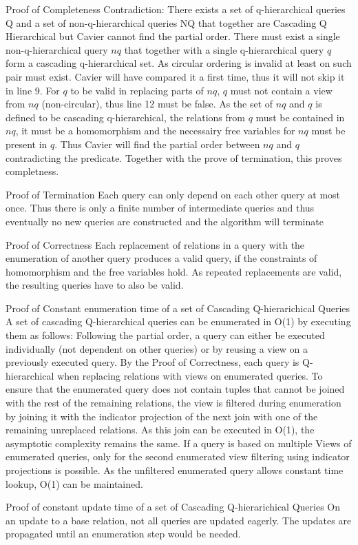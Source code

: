 \documentclass[]{article}
\begin{document}
\begin{section}{Proof of Completeness}
	Contradiction: There exists a set of q-hierarchical queries Q and a set of non-q-hierarchical queries NQ that together are Cascading Q Hierarchical but Cavier cannot find the partial order. There must exist a single non-q-hierarchical query $nq$ that together with a single q-hierarchical query $q$ form a cascading q-hierarchical set. As circular ordering is invalid at least on such pair must exist.
	Cavier will have compared it a first time, thus it will not skip it in line 9.
	For $q$ to be valid in replacing parts of $nq$, $q$ must not contain a view from $nq$ (non-circular), thus line 12 must be false.
	As the set of $nq$ and $q$ is defined to be cascading q-hierarchical, the relations from $q$ must be contained in $nq$, it must be a homomorphism and the necessairy free variables for $nq$ must be present in $q$. Thus Cavier will find the partial order between $nq$ and $q$ contradicting the predicate.
	Together with the prove of termination, this proves completness.
	
\end{section}
\begin{section}{Proof of Termination}
	Each query can only depend on each other query at most once. Thus there is only a finite number of intermediate queries and thus eventually no new queries are constructed and the algorithm will terminate	
\end{section}
\begin{section}{Proof of Correctness}
	Each replacement of relations in a query with the enumeration of another query produces a valid query, if the constraints of homomorphism and the free variables hold. As repeated replacements are valid, the resulting queries have to also be valid.
\end{section}

\begin{section}{Proof of Constant enumeration time of a set of Cascading Q-hierarichical Queries}
A set of cascading Q-hierarchical queries can be enumerated in O(1) by executing them as follows:
Following the partial order, a query can either be executed individually (not dependent on other queries) or by reusing a view on a previously executed query. By the Proof of Correctness, each query is Q-hierarchical when replacing relations with views on enumerated queries. To ensure that the enumerated query does not contain tuples that cannot be joined with the rest of the  remaining relations, the view is filtered during enumeration by joining it with the indicator projection of the next join with one of the remaining unreplaced relations. As this join can be executed in O(1), the asymptotic complexity remains the same. 
If a query is based on multiple Views of enumerated queries, only for the second enumerated view filtering using indicator projections is possible. As the unfiltered enumerated query allows constant time lookup, O(1) can be maintained.
\end{section}

\begin{section}{Proof of  constant update time of a set of Cascading Q-hierarichical Queries}
	On an update to a base relation, not all queries are updated eagerly. The updates are propagated until an enumeration step would be needed.
\end{section}
\end{document}
